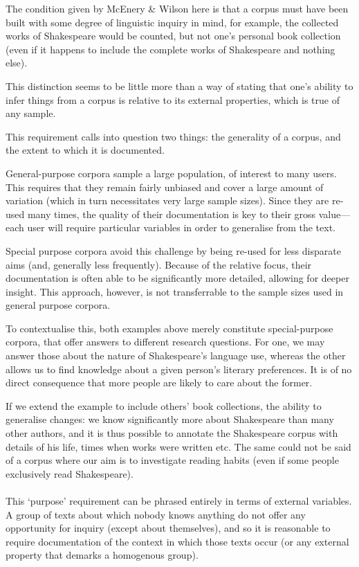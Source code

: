 The condition given by McEnery \& Wilson\cite{} here is that a corpus must have been built with some degree of linguistic inquiry in mind, for example, the collected works of Shakespeare would be counted, but not one's personal book collection (even if it happens to include the complete works of Shakespeare and nothing else).

This distinction seems to be little more than a way of stating that one's ability to infer things from a corpus is relative to its external properties, which is true of any sample.

This requirement calls into question two things: the generality of a corpus, and the extent to which it is documented.

General-purpose corpora sample a large population, of interest to many users.  This requires that they remain fairly unbiased and cover a large amount of variation (which in turn necessitates very large sample sizes).  Since they are re-used many times, the quality of their documentation is key to their gross value---each user will require particular variables in order to generalise from the text.

Special purpose corpora avoid this challenge by being re-used for less disparate aims (and, generally less frequently).  Because of the relative focus, their documentation is often able to be significantly more detailed, allowing for deeper insight.  This approach, however, is not transferrable to the sample sizes used in general purpose corpora.

To contextualise this, both examples above merely constitute special-purpose corpora, that offer answers to different research questions.  For one, we may answer those about the nature of Shakespeare's language use, whereas the other allows us to find knowledge about a given person's literary preferences.  It is of no direct consequence that more people are likely to care about the former.

If we extend the example to include others' book collections, the ability to generalise changes: we know significantly more about Shakespeare than many other authors, and it is thus possible to annotate the Shakespeare corpus with details of his life, times when works were written etc.  The same could not be said of a corpus where our aim is to investigate reading habits (even if some people exclusively read Shakespeare).

\paragraph{}
This `purpose' requirement can be phrased entirely in terms of external variables.
A group of texts about which nobody knows anything do not offer any opportunity for inquiry (except about themselves), and so it is reasonable to require documentation of the context in which those texts occur (or any external property that demarks a homogenous group).

